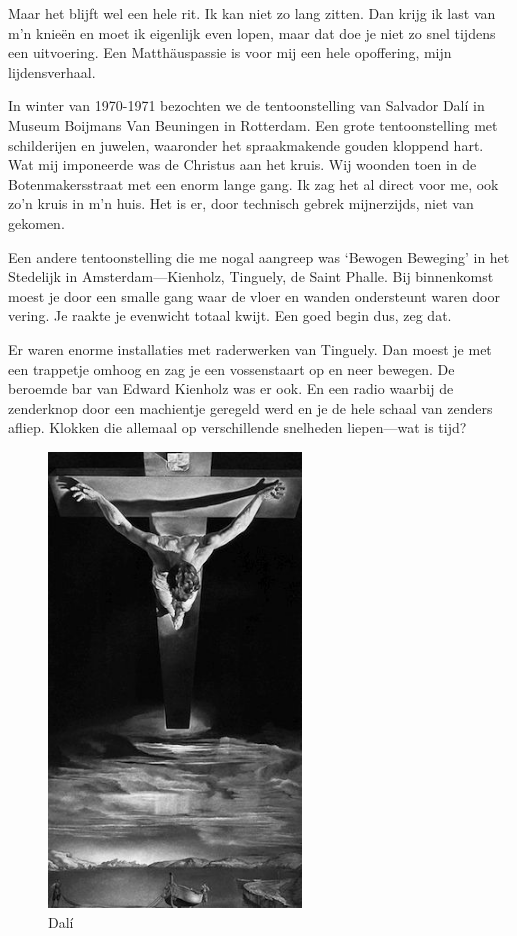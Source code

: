 \documentclass[12pt,twoside, openright]{memoir}
\begin{document}
Maar het blijft wel een hele rit. Ik kan niet zo lang zitten. Dan krijg ik last van m’n knieën en moet ik eigenlijk even lopen, maar dat doe je niet zo snel tijdens een uitvoering. Een Matthäuspassie is voor mij een hele opoffering, mijn lijdensverhaal.

In winter van 1970-1971 bezochten we de tentoonstelling van Salvador Dalí in Museum Boijmans Van Beuningen in Rotterdam. Een grote tentoonstelling met schilderijen en juwelen, waaronder het spraakmakende gouden kloppend hart. Wat mij imponeerde was de Christus aan het kruis. Wij woonden toen in de Botenmakersstraat met een enorm lange gang. Ik zag het al direct voor me, ook zo’n kruis in m’n huis. Het is er, door technisch gebrek mijnerzijds, niet van gekomen.

Een andere tentoonstelling die me nogal aangreep was `Bewogen Beweging' in het Stedelijk in Amsterdam---Kienholz, Tinguely, de Saint Phalle. Bij binnenkomst moest je door een smalle gang waar de vloer en wanden ondersteunt waren door vering. Je raakte je evenwicht totaal kwijt. Een goed begin dus, zeg dat.

Er waren enorme installaties met raderwerken van Tinguely. Dan moest je met een trappetje omhoog en zag je een vossenstaart op en neer bewegen. De beroemde bar van Edward Kienholz was er ook. En een radio waarbij de zenderknop door een machientje geregeld werd en je de hele schaal van zenders afliep. Klokken die allemaal op verschillende snelheden liepen---wat is tijd? 

\begin{figure}
\centering
\includegraphics[width=0.6\textwidth]{img/190dali.jpg}
\caption*{\footnotesize Dalí}
\end{figure}
\end{document}
